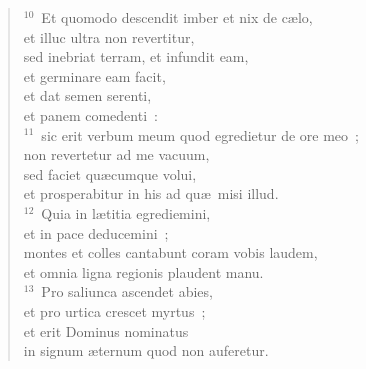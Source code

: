 \begin{flushleft}
\begin{verse}
${}^{10}$~Et quomodo descendit imber et nix de c\ae lo,\\ et illuc ultra non revertitur,\\ sed inebriat terram, et infundit eam,\\ et germinare eam facit,\\ et dat semen serenti,\\ et panem comedenti~:\\
${}^{11}$~sic erit verbum meum quod egredietur de ore meo~;\\ non revertetur ad me vacuum,\\ sed faciet qu\ae cumque volui,\\ et prosperabitur in his ad qu\ae\ misi illud.\\
${}^{12}$~Quia in l\ae titia egrediemini,\\ et in pace deducemini~;\\ montes et colles cantabunt coram vobis laudem,\\ et omnia ligna regionis plaudent manu.\\
${}^{13}$~Pro saliunca ascendet abies,\\ et pro urtica crescet myrtus~;\\ et erit Dominus nominatus\\ in signum \ae ternum quod non auferetur.\end{verse}\end{flushleft}


